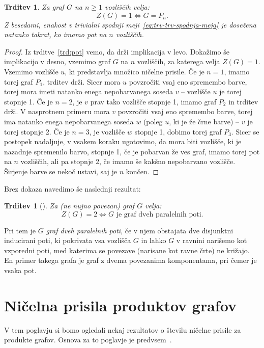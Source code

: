 \documentclass[12pt,a4paper,twoside]{article}
\theoremstyle{definition} %
\theoremstyle{plain} %
\newtheorem{trditev}[definicija]{Trditev}
\numberwithin{equation}{section}  %
\begin{document}
\begin{trditev}{{\cite[ugotovitev 2.1]{row2012technique}}}
    Za graf $G$ na $n \geq 1$ vozliščih velja:
    \[ Z(G) = 1 \iff G = P_n. \]
    Z besedami, enakost v trivialni spodnji meji~\eqref{eq:trv-trv-spodnja-meja} je dosežena natanko takrat, ko imamo pot na $n$ vozliščih.
\end{trditev}
\begin{proof}
    Iz trditve~\ref{trd:pot} vemo, da drži implikacija v levo. Dokažimo še implikacijo v desno, vzemimo graf $G$ na $n$ vozliščih, za katerega velja $Z(G) = 1$. Vzemimo vozlišče $u$, ki predstavlja množico ničelne prisile. Če je $n = 1$, imamo torej graf $P_1$, trditev drži. Sicer mora $u$ povzročiti vsaj eno spremembo barve, torej mora imeti natanko enega nepobarvanega soseda $v$ -- vozlišče $u$ je torej stopnje 1. Če je $n=2$, je $v$ prav tako vozlišče stopnje 1, imamo graf $P_2$ in trditev drži.  V nasprotnem primeru mora $v$ povzročiti vsaj eno spremembo barve, torej ima natanko enega nepobarvanega soseda $w$ (poleg $u$, ki je že črne barve) -- $v$ je torej stopnje 2. Če je $n=3$, je vozlišče $w$ stopnje 1, dobimo torej graf $P_3$. Sicer se postopek nadaljuje, v vsakem koraku ugotovimo, da mora biti vozlišče, ki je nazadnje spremenilo barvo, stopnje 1, če je pobarvan že ves graf, imamo torej pot na $n$ vozliščih, ali pa stopnje 2, če imamo še kakšno nepobarvano vozlišče. Širjenje barve se nekoč ustavi, saj je $n$ končen.
\end{proof}

Brez dokaza navedimo še naslednji rezultat:
\begin{trditev}[{\cite[izrek~2.3]{row2012technique}}]
    Za (ne nujno povezan) graf $G$ velja:
    \[ Z(G) = 2 \iff G \text{ je graf dveh paralelnih poti}. \]
\end{trditev}
Pri tem je $G$ \emph{graf dveh paralelnih poti}, če v njem obstajata dve disjunktni inducirani poti, ki pokrivata vsa vozlišča $G$ in lahko $G$ v ravnini narišemo kot vzporedni poti, med katerima se povezave (narisane kot ravne črte) ne križajo. En primer takega grafa je graf z dvema povezanima komponentama, pri čemer je vsaka pot.

\section{Ničelna prisila produktov grafov}
V tem poglavju si bomo ogledali nekaj rezultatov o številu ničelne prisile za produkte grafov. Osnova za to poglavje je predvsem~\cite{aim2008minimumrank}.
\end{document}
